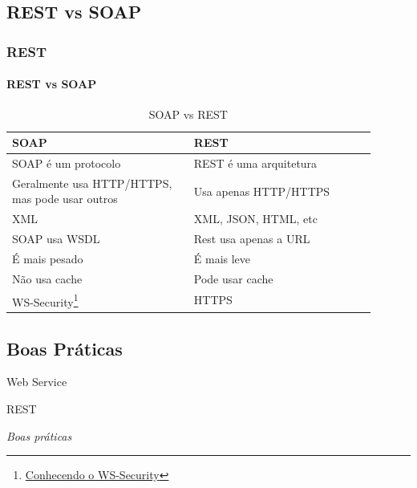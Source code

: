\documentclass[
	9pt, %
	t, %
]{beamer}
\begin{document}
\subsection{REST vs SOAP}

\begin{frame}
	\frametitle{REST}
	\framesubtitle{REST vs SOAP}
	
	\begin{table}
		\renewcommand{\arraystretch}{1.25} %
		\begin{tabular}{|p{0.45\linewidth}|p{0.45\linewidth}|}
			\hline
			\textbf{SOAP} & \textbf{REST} \\ \hline
			SOAP é um protocolo & REST é uma arquitetura \\ \hline
			Geralmente usa HTTP/HTTPS, mas pode usar outros & Usa apenas HTTP/HTTPS \\ \hline
			XML & XML, JSON, HTML, etc \\ \hline
			SOAP usa WSDL & Rest usa apenas a URL \\ \hline
			É mais pesado & É mais leve \\ \hline
			Não usa cache & Pode usar cache \\ \hline
			WS-Security\footnote{\href{https://xaropedecafe.medium.com/conhecendo-o-ws-security-c6c775b461fd}{Conhecendo o WS-Security}} & HTTPS \\ \hline
		\end{tabular}
		\caption{SOAP vs REST}
		\label{tab:soap_rest}

	\end{table}

\end{frame}

\subsection{Boas Práticas}

\begin{frame}
	\begin{center}
		
		\bigskip\bigskip\bigskip\bigskip %
		{\Large Web Service}
		
		\bigskip\bigskip %
		{\Huge REST}
		
		\smallskip
		{\small \textit{Boas práticas}}
	\end{center}

\end{frame}
\end{document}
